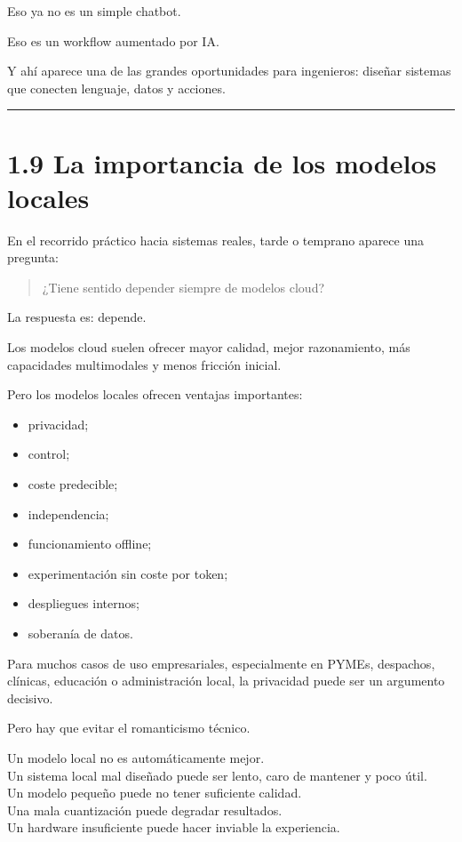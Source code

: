 Eso ya no es un simple chatbot.

Eso es un workflow aumentado por IA.

Y ahí aparece una de las grandes oportunidades para ingenieros: diseñar
sistemas que conecten lenguaje, datos y acciones.

\begin{center}\rule{0.5\linewidth}{0.5pt}\end{center}

\section{1.9 La importancia de los modelos
locales}\label{la-importancia-de-los-modelos-locales}

En el recorrido práctico hacia sistemas reales, tarde o temprano aparece
una pregunta:

\begin{quote}
¿Tiene sentido depender siempre de modelos cloud?
\end{quote}

La respuesta es: depende.

Los modelos cloud suelen ofrecer mayor calidad, mejor razonamiento, más
capacidades multimodales y menos fricción inicial.

Pero los modelos locales ofrecen ventajas importantes:

\begin{itemize}
\tightlist
\item
  privacidad;
\item
  control;
\item
  coste predecible;
\item
  independencia;
\item
  funcionamiento offline;
\item
  experimentación sin coste por token;
\item
  despliegues internos;
\item
  soberanía de datos.
\end{itemize}

Para muchos casos de uso empresariales, especialmente en PYMEs,
despachos, clínicas, educación o administración local, la privacidad
puede ser un argumento decisivo.

Pero hay que evitar el romanticismo técnico.

Un modelo local no es automáticamente mejor.\\
Un sistema local mal diseñado puede ser lento, caro de mantener y poco
útil.\\
Un modelo pequeño puede no tener suficiente calidad.\\
Una mala cuantización puede degradar resultados.\\
Un hardware insuficiente puede hacer inviable la experiencia.

